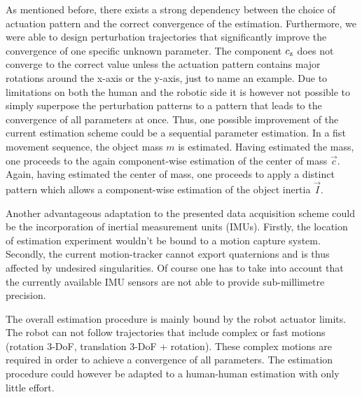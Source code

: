 As mentioned before, there exists a strong dependency between the choice of actuation pattern and the correct convergence of the estimation. Furthermore, we were able to design perturbation trajectories that significantly improve the convergence of one specific unknown parameter. The component $c_{\mathrm{z}}$ does not converge to the correct value unless the actuation pattern contains major rotations around the x-axis or the y-axis, just to name an example. Due to limitations on both the human and the robotic side it is however not possible to simply superpose the perturbation patterns to a pattern that leads to the convergence of all parameters at once. Thus, one possible improvement of the current estimation scheme could be a sequential parameter estimation. In a fist movement sequence, the object mass $m$ is estimated. Having estimated the mass, one proceeds to the again component-wise estimation of the center of mass $\vec{c}$. Again, having estimated the center of mass, one proceeds to apply a distinct pattern which allows a component-wise estimation of the object inertia $\vec{I}$.

Another advantageous adaptation to the presented data acquisition scheme could be the incorporation of inertial measurement units (IMUs). Firstly, the location of estimation experiment wouldn't be bound to a motion capture system. Secondly, the current motion-tracker cannot export quaternions and is thus affected by undesired singularities. Of course one has to take into account that the currently available IMU sensors are not able to provide sub-millimetre precision.

The overall estimation procedure is mainly bound by the robot actuator limits. The robot can not follow trajectories that include complex or fast motions (rotation 3-DoF, translation 3-DoF + rotation). These complex motions are required in order to achieve a convergence of all parameters. The estimation procedure could however be adapted to a human-human estimation with only little effort.
